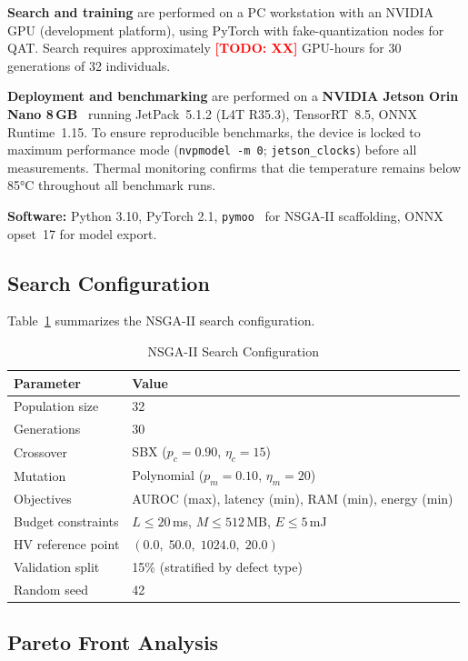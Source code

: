 \documentclass[journal]{IEEEtran}
\newcommand{\TODO}[1]{\textcolor{red}{\textbf{[TODO: #1]}}}
\begin{document}
\textbf{Search and training} are performed on a PC workstation with an NVIDIA
GPU (development platform), using PyTorch with fake-quantization nodes
for QAT.
Search requires approximately \TODO{XX} GPU-hours for 30 generations of 32
individuals.

\textbf{Deployment and benchmarking} are performed on a
\textbf{NVIDIA Jetson Orin Nano 8\,GB}~\cite{nvidia2023jetson} running
JetPack~5.1.2 (L4T R35.3), TensorRT~8.5, ONNX Runtime~1.15.
To ensure reproducible benchmarks, the device is locked to maximum
performance mode (\texttt{nvpmodel -m 0}; \texttt{jetson\_clocks}) before all
measurements.
Thermal monitoring confirms that die temperature remains below 85°C throughout
all benchmark runs.

\textbf{Software:} Python 3.10, PyTorch 2.1, \texttt{pymoo}~\cite{blank2020pymoo}
for NSGA-II scaffolding, ONNX opset~17 for model export.

\subsection{Search Configuration}
\label{sec:search_config}

Table~\ref{tab:search_config} summarizes the NSGA-II search configuration.

\begin{table}[!t]
\caption{NSGA-II Search Configuration}
\label{tab:search_config}
\centering
\begin{tabular}{@{}ll@{}}
\toprule
\textbf{Parameter} & \textbf{Value} \\
\midrule
Population size & 32 \\
Generations & 30 \\
Crossover & SBX ($p_c = 0.90$, $\eta_c = 15$) \\
Mutation & Polynomial ($p_m = 0.10$, $\eta_m = 20$) \\
Objectives & AUROC (max), latency (min), RAM (min), energy (min) \\
Budget constraints & $L \leq 20$\,ms, $M \leq 512$\,MB, $E \leq 5$\,mJ \\
HV reference point & $(0.0,\;50.0,\;1024.0,\;20.0)$ \\
Validation split & 15\% (stratified by defect type) \\
Random seed & 42 \\
\bottomrule
\end{tabular}
\end{table}

\subsection{Pareto Front Analysis}
\label{sec:pareto_results}
\end{document}
